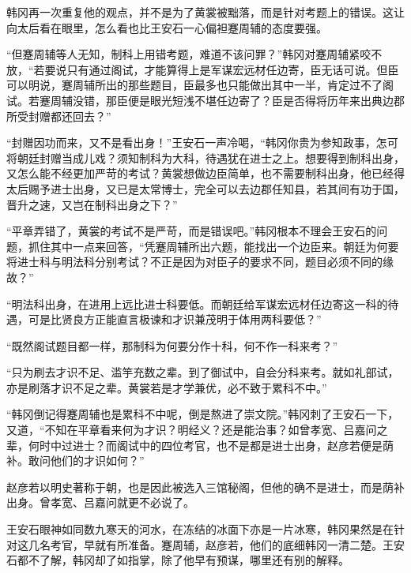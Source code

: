 韩冈再一次重复他的观点，并不是为了黄裳被黜落，而是针对考题上的错误。这让向太后看在眼里，怎么看也比王安石一心偏袒蹇周辅的态度要强。

“但蹇周辅等人无知，制科上用错考题，难道不该问罪？”韩冈对蹇周辅紧咬不放，“若要说只有通过阁试，才能算得上是军谋宏远材任边寄，臣无话可说。但臣可以明说，蹇周辅所出的那些题目，臣最多也只能做出其中一半，肯定过不了阁试。若蹇周辅没错，那臣便是眼光短浅不堪任边寄了？臣是否得将历年来出典边郡所受封赠都还回去？”

“封赠因功而来，又不是看出身！”王安石一声冷喝，“韩冈你贵为参知政事，怎可将朝廷封赠当成儿戏？须知制科为大科，待遇犹在进士之上。想要得到制科出身，又怎么能不经更加严苛的考试？黄裳想做边臣简单，也不需要制科出身，他已经得太后赐予进士出身，又已是太常博士，完全可以去边郡任知县，若其间有功于国，晋升之速，又岂在制科出身之下？”

“平章弄错了，黄裳的考试不是严苛，而是错误吧。”韩冈根本不理会王安石的问题，抓住其中一点来回答，“凭蹇周辅所出六题，能找出一个边臣来。朝廷为何要将进士科与明法科分别考试？不正是因为对臣子的要求不同，题目必须不同的缘故？”

“明法科出身，在进用上远比进士科要低。而朝廷给军谋宏远材任边寄这一科的待遇，可是比贤良方正能直言极谏和才识兼茂明于体用两科要低？”

“既然阁试题目都一样，那制科为何要分作十科，何不作一科来考？”

“只为刷去才识不足、滥竽充数之辈。到了御试中，自会分科来考。就如礼部试，亦是刷落才识不足之辈。黄裳若是才学兼优，必不致于累科不中。”

“韩冈倒记得蹇周辅也是累科不中呢，倒是熬进了崇文院。”韩冈刺了王安石一下，又道，“不知在平章看来何为才识？明经义？还是能治事？如曾孝宽、吕嘉问之辈，何时中过进士？而阁试中的四位考官，也不是都是进士出身，赵彦若便是荫补。敢问他们的才识如何？”

赵彦若以明史著称于朝，也是因此被选入三馆秘阁，但他的确不是进士，而是荫补出身。曾孝宽、吕嘉问就更不必说了。

王安石眼神如同数九寒天的河水，在冻结的冰面下亦是一片冰寒，韩冈果然是在针对这几名考官，早就有所准备。蹇周辅，赵彦若，他们的底细韩冈一清二楚。王安石都不了解，韩冈却了如指掌，除了他早有预谋，哪里还有别的解释。
